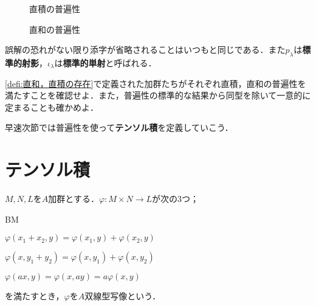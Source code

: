 \begin{minipage}{.45\textwidth}
	\begin{figure}[H]
		\centering
		\caption{直積の普遍性}
	\end{figure}
\end{minipage}
\hfill
\begin{minipage}{.45\textwidth}
	\begin{figure}[H]
		\centering
		\caption{直和の普遍性}
	\end{figure}
\end{minipage}

誤解の恐れがない限り添字が省略されることはいつもと同じである．また$p_\lambda$は\textbf{標準的射影}，$\iota_\lambda$は\textbf{標準的単射}と呼ばれる．

\begin{exer}
\ref{defi:直和，直積の存在}で定義された加群たちがそれぞれ直積，直和の普遍性を満たすことを確認せよ．また，普遍性の標準的な結果から同型を除いて一意的に定まることも確かめよ．
\end{exer}

早速次節では普遍性を使って\textbf{テンソル積}を定義していこう．

\section{テンソル積}

\begin{defi}[双線型写像]
	$M,N,L$を$A$加群とする．$\varphi:M\times N\to L$が次の3つ；
	\begin{defiterm}{BM}
		\item $\varphi(x_1+x_2,y)=\varphi(x_1,y)+\varphi(x_2,y)$
		\item $\varphi(x,y_1+y_2)=\varphi(x,y_1)+\varphi(x,y_2)$
		\item $\varphi(ax,y)=\varphi(x,ay)=a\varphi(x,y)$
	\end{defiterm}
	を満たすとき，$\varphi$を$A$双線型写像という．
\end{defi}

